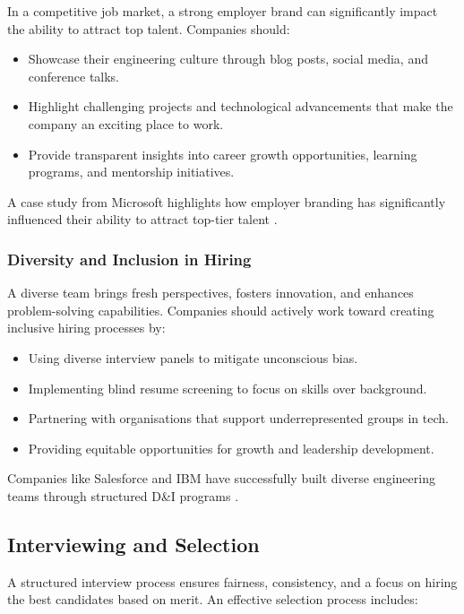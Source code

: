 In a competitive job market, a strong employer brand can significantly impact the ability to attract top talent. Companies should:

\begin{itemize}
    \item Showcase their engineering culture through blog posts, social media, and conference talks.
    \item Highlight challenging projects and technological advancements that make the company an exciting place to work.
    \item Provide transparent insights into career growth opportunities, learning programs, and mentorship initiatives.
\end{itemize}

A case study from Microsoft highlights how employer branding has significantly influenced their ability to attract top-tier talent \cite{MicrosoftBranding}.

\subsubsection{Diversity and Inclusion in Hiring}

A diverse team brings fresh perspectives, fosters innovation, and enhances problem-solving capabilities. Companies should actively work toward creating inclusive hiring processes by:

\begin{itemize}
    \item Using diverse interview panels to mitigate unconscious bias.
    \item Implementing blind resume screening to focus on skills over background.
    \item Partnering with organisations that support underrepresented groups in tech.
    \item Providing equitable opportunities for growth and leadership development.
\end{itemize}

Companies like Salesforce and IBM have successfully built diverse engineering teams through structured D\&I programs \cite{SalesforceDiversity}.

\subsection{Interviewing and Selection}

A structured interview process ensures fairness, consistency, and a focus on hiring the best candidates based on merit. An effective selection process includes:

